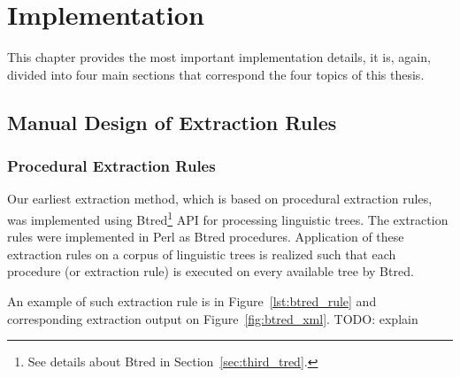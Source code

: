 \chapter{Implementation} \label{sec:ch_implementation}

This chapter provides the most important implementation details, it is, again, divided into four main sections that correspond the four topics of this thesis.

\section{Manual Design of Extraction Rules} \label{sec:impl_manual_rules} \graphicspath{{../img/ch50/}}


\subsection{Procedural Extraction Rules} \label{sec:ch50_Procedural_Extraction_Rules} \label{sec:impl_btred_rules}

Our earliest extraction method, which is based on procedural extraction rules, was implemented using Btred\footnote{See details about Btred in Section~\ref{sec:third_tred}.} API for processing linguistic trees. The extraction rules were implemented in Perl as Btred procedures. Application of these extraction rules on a corpus of linguistic trees is realized such that each procedure (or extraction rule) is executed on every available tree by Btred. 

An example of such extraction rule is in Figure~\ref{lst:btred_rule} and corresponding extraction output on Figure~\ref{fig:btred_xml}. TODO: explain


